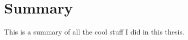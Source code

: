 

\chapter*{Summary}
\label{sec:summary}

This is a summary of all the cool stuff I did in this thesis.


\lipsum[1-2]

